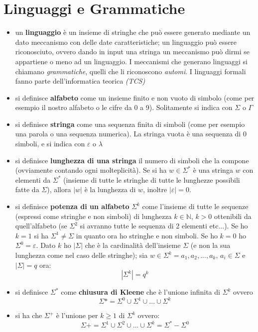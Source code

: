 \documentclass[a4paper,12pt, oneside]{book}
\begin{document}
\chapter{Linguaggi e Grammatiche}
\begin{itemize}
	\item un \textbf{linguaggio }è un insieme di stringhe che può essere generato mediante un dato meccanismo con delle date caratteristiche; un linguaggio può essere riconosciuto, ovvero dando in input una stringa un meccanismo può dirmi se appartiene o meno ad un linguaggio. I meccanismi che generano linguaggi si chiamano \textit{grammatiche}, quelli che li riconoscono \textit{automi}. I linguaggi formali fanno parte dell'informatica teorica \textit{(TCS)}
	\item si definisce \textbf{alfabeto} come un insieme finito e non vuoto di simbolo (come per esempio il nostro alfabeto o le cifre da 0 a 9). Solitamente si indica con $\Sigma$ o $\Gamma$
	\item si definisce \textbf{stringa} come una sequenza finita di simboli (come per esempio una parola o una sequenza numerica). La stringa vuota è una sequenza di 0 simboli, e si indica con $\varepsilon$ o $\lambda$
	\item si definisce \textbf{lunghezza di una stringa} il numero di simboli che la compone (ovviamente contando ogni molteplicità). Se si ha $w\in \Sigma^*$ è una stringa $w$ con elementi da $\Sigma^*$ (insieme di tutte le stringhe di tutte le lunghezze possibili fatte da $\Sigma$), allora $|w|$ è la lunghezza di $w$, inoltre $|\varepsilon|=0$.
	\item si definisce \textbf{potenza di un alfabeto} $\Sigma^k$ come l'insieme di tutte le sequenze (espressi come stringhe e non simboli) di lunghezza $k\in\mathbb{N},\, k>0$ ottenibili da quell'alfabeto (se $\Sigma^2$ si avranno tutte le sequenza di 2 elementi etc...). Se ho $k=1$ si ha $\Sigma^1\neq \Sigma$ in quanto ora ho stringhe e non simboli. Se ho $k=0$ ho $\Sigma^0=\varepsilon$. Dato $k$ ho $|\Sigma|$ che è la cardinalità dell'insieme $\Sigma$ (e non la sua lunghezza come nel caso delle stringhe); sia $w\in\Sigma^k=a_1,a_2,...,a_k,\,a_i\in\Sigma$ e $|\Sigma|=q$ ora: $$|\Sigma^k|=q^k$$
	\item si definisce $\Sigma^*$ come\textbf{ chiusura di Kleene} che è l'unione infinita di $\Sigma^k$ ovvero $$\Sigma*=\Sigma^0\cup \Sigma^1\cup...\cup \Sigma^k$$
	\item si ha che $\Sigma^+$ è l'unione per $k\geq 1$ di $\Sigma^k$ ovvero:
	      $$\Sigma+=\Sigma^1\cup \Sigma^2\cup...\cup \Sigma^k= \Sigma^*-\Sigma^0$$

\end{itemize}
\end{document}

